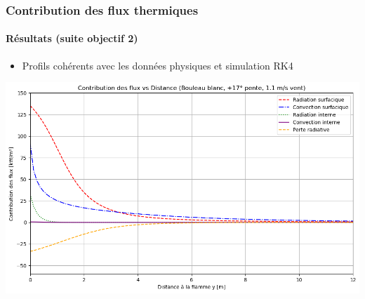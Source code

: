 \documentclass[handout]{beamer}
\newtheorem{pbm et hypo}[thm]{Problématique et hypothèses}
\begin{document}
	
	\begin{frame}
		\frametitle{\textbf{Contribution des flux thermiques}}
		\framesubtitle{\textbf{Résultats (suite objectif 2)}}
		
	\begin{itemize}
			\item Profils cohérents avec les données physiques et simulation RK4
		\end{itemize}
		
		\begin{center}
			\includegraphics[width=0.75\linewidth]{py5}
		\end{center}
	
	\end{frame}
	
\end{document}
